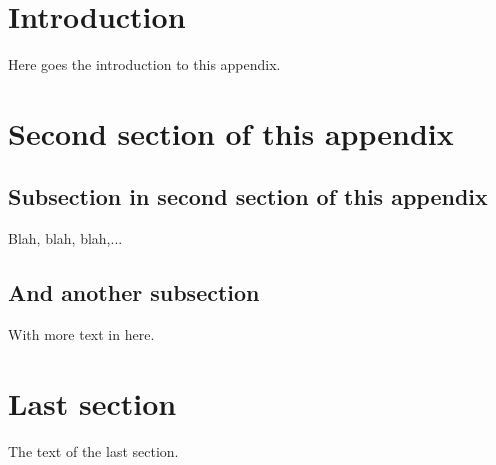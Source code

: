 

\section{Introduction} \label{sec:Appendix1Intro}

Here goes the introduction to this appendix. 
\section{Second section of this appendix} \label{sec:Appendix1Section2}

\subsection{Subsection in second section of this appendix}

Blah, blah, blah,...


\subsection{And another subsection}

With more text in here.

\section{Last section}

The text of the last section.
